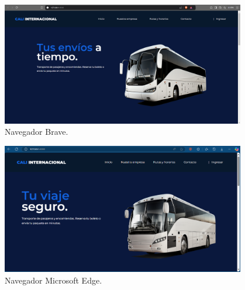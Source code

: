 \vspace{3cm} %

\begin{figure}[!h] %
	\caption[Navegador Brave]
	{\newline Navegador Brave.} %
	\centering
	\includegraphics[width=0.95\textwidth]{imagenes/cap_3/brave.png} %
	
	\label{fig:figura_brave} %
\end{figure}

\vspace{1cm} %

\begin{figure}[!h] %
	\caption[Navegador Microsoft Edge]
	{\newline Navegador Microsoft Edge.} %
	\centering
	\includegraphics[width=0.95\textwidth]{imagenes/cap_3/edge.png} %
	
	\vspace{16pt}
	\label{fig:figura_edge} %
\end{figure}

